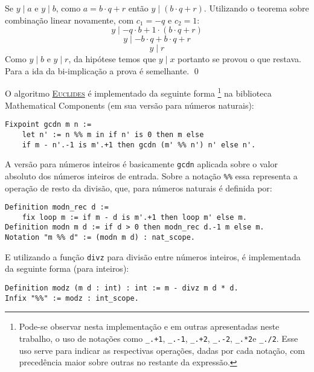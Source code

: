         Se $y \mid a$ e $y \mid b$, como $a = b \cdot q + r$ então
        $y \mid (b \cdot q + r)$. Utilizando o teorema sobre combinação linear novamente, com $c_1 = -q$ e $c_2 = 1$:
        \begin{equation*}
            y \mid -q \cdot b + 1 \cdot (b \cdot q + r) 
        \end{equation*}
        \begin{equation*}
            y \mid - b \cdot q + b \cdot q + r 
        \end{equation*}
        \begin{equation*}
            y \mid r 
        \end{equation*}
        Como $y \mid b$ e $y \mid r$, da hipótese temos que $y \mid x$ portanto se provou o que restava. Para a ida da bi-implicação a prova é semelhante. \qed

O algoritmo \hyperref[algo:euclides]{\textsc{Euclides}} é implementado da seguinte forma \footnote{Pode-se observar nesta implementação e em outras apresentadas neste trabalho, o uso de notações como \codequotes\lstinline[language=coq-error]|_.+1|\codequotes, \codequotes\lstinline[language=coq]|_.-1|\codequotes, \codequotes\lstinline[language=coq]|_.+2|\codequotes, \codequotes\lstinline[language=coq]|_.-2|\codequotes, \codequotes\lstinline[language=coq]|_.*2|\codequotes\;e \codequotes\lstinline[language=coq]|_./2|\codequotes. Esse uso serve para indicar as respectivas operações, dadas por cada notação, com precedência maior sobre outras no restante da expressão.} na biblioteca Mathematical Components (em sua versão para números naturais):
    \begin{lstlisting}[language=coq,frame=single,tabsize=1]
Fixpoint gcdn m n :=
    let n' := n %% m in if n' is 0 then m else
    if m - n'.-1 is m'.+1 then gcdn (m' %% n') n' else n'.
    \end{lstlisting}
A versão para números inteiros é basicamente \lstinline[language = coq]{gcdn} aplicada sobre o valor absoluto dos números inteiros de entrada.
Sobre a notação \lstinline[language = coq]{%%} essa representa a operação de resto da divisão, que, para números naturais é definida por:
    \begin{lstlisting}[language=coq,frame=single,tabsize=1]
Definition modn_rec d := 
    fix loop m := if m - d is m'.+1 then loop m' else m.
Definition modn m d := if d > 0 then modn_rec d.-1 m else m.
Notation "m %% d" := (modn m d) : nat_scope.
    \end{lstlisting}
E utilizando a função 
\lstinline[language = coq]{divz} para divisão entre números inteiros, é implementada da seguinte forma (para inteiros):
    \begin{lstlisting}[language=coq,frame=single,tabsize=1]
Definition modz (m d : int) : int := m - divz m d * d.
Infix "%%" := modz : int_scope.
    \end{lstlisting}

